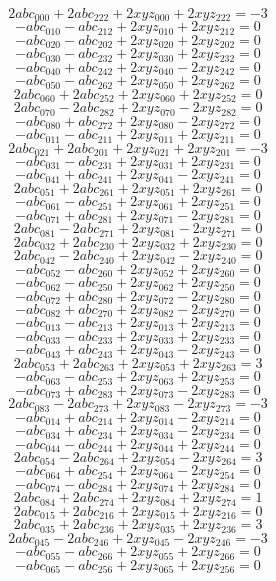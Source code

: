 \[ 2 abc_{000} + 2 abc_{222} + 2 xyz_{000} + 2 xyz_{222} = -3 \]
\[ - abc_{010} - abc_{212} + 2 xyz_{010} + 2 xyz_{212} = 0 \]
\[ - abc_{020} - abc_{202} + 2 xyz_{020} + 2 xyz_{202} = 0 \]
\[ - abc_{030} - abc_{232} + 2 xyz_{030} + 2 xyz_{232} = 0 \]
\[ - abc_{040} + abc_{242} + 2 xyz_{040} - 2 xyz_{242} = 0 \]
\[ - abc_{050} - abc_{262} + 2 xyz_{050} + 2 xyz_{262} = 0 \]
\[ 2 abc_{060} + 2 abc_{252} + 2 xyz_{060} + 2 xyz_{252} = 0 \]
\[ 2 abc_{070} - 2 abc_{282} + 2 xyz_{070} - 2 xyz_{282} = 0 \]
\[ - abc_{080} + abc_{272} + 2 xyz_{080} - 2 xyz_{272} = 0 \]
\[ - abc_{011} - abc_{211} + 2 xyz_{011} + 2 xyz_{211} = 0 \]
\[ 2 abc_{021} + 2 abc_{201} + 2 xyz_{021} + 2 xyz_{201} = -3 \]
\[ - abc_{031} - abc_{231} + 2 xyz_{031} + 2 xyz_{231} = 0 \]
\[ - abc_{041} + abc_{241} + 2 xyz_{041} - 2 xyz_{241} = 0 \]
\[ 2 abc_{051} + 2 abc_{261} + 2 xyz_{051} + 2 xyz_{261} = 0 \]
\[ - abc_{061} - abc_{251} + 2 xyz_{061} + 2 xyz_{251} = 0 \]
\[ - abc_{071} + abc_{281} + 2 xyz_{071} - 2 xyz_{281} = 0 \]
\[ 2 abc_{081} - 2 abc_{271} + 2 xyz_{081} - 2 xyz_{271} = 0 \]
\[ 2 abc_{032} + 2 abc_{230} + 2 xyz_{032} + 2 xyz_{230} = 0 \]
\[ 2 abc_{042} - 2 abc_{240} + 2 xyz_{042} - 2 xyz_{240} = 0 \]
\[ - abc_{052} - abc_{260} + 2 xyz_{052} + 2 xyz_{260} = 0 \]
\[ - abc_{062} - abc_{250} + 2 xyz_{062} + 2 xyz_{250} = 0 \]
\[ - abc_{072} + abc_{280} + 2 xyz_{072} - 2 xyz_{280} = 0 \]
\[ - abc_{082} + abc_{270} + 2 xyz_{082} - 2 xyz_{270} = 0 \]
\[ - abc_{013} - abc_{213} + 2 xyz_{013} + 2 xyz_{213} = 0 \]
\[ - abc_{033} - abc_{233} + 2 xyz_{033} + 2 xyz_{233} = 0 \]
\[ - abc_{043} + abc_{243} + 2 xyz_{043} - 2 xyz_{243} = 0 \]
\[ 2 abc_{053} + 2 abc_{263} + 2 xyz_{053} + 2 xyz_{263} = 3 \]
\[ - abc_{063} - abc_{253} + 2 xyz_{063} + 2 xyz_{253} = 0 \]
\[ - abc_{073} + abc_{283} + 2 xyz_{073} - 2 xyz_{283} = 0 \]
\[ 2 abc_{083} - 2 abc_{273} + 2 xyz_{083} - 2 xyz_{273} = -3 \]
\[ - abc_{014} + abc_{214} + 2 xyz_{014} - 2 xyz_{214} = 0 \]
\[ - abc_{034} + abc_{234} + 2 xyz_{034} - 2 xyz_{234} = 0 \]
\[ - abc_{044} - abc_{244} + 2 xyz_{044} + 2 xyz_{244} = 0 \]
\[ 2 abc_{054} - 2 abc_{264} + 2 xyz_{054} - 2 xyz_{264} = 3 \]
\[ - abc_{064} + abc_{254} + 2 xyz_{064} - 2 xyz_{254} = 0 \]
\[ - abc_{074} - abc_{284} + 2 xyz_{074} + 2 xyz_{284} = 0 \]
\[ 2 abc_{084} + 2 abc_{274} + 2 xyz_{084} + 2 xyz_{274} = 1 \]
\[ 2 abc_{015} + 2 abc_{216} + 2 xyz_{015} + 2 xyz_{216} = 0 \]
\[ 2 abc_{035} + 2 abc_{236} + 2 xyz_{035} + 2 xyz_{236} = 3 \]
\[ 2 abc_{045} - 2 abc_{246} + 2 xyz_{045} - 2 xyz_{246} = -3 \]
\[ - abc_{055} - abc_{266} + 2 xyz_{055} + 2 xyz_{266} = 0 \]
\[ - abc_{065} - abc_{256} + 2 xyz_{065} + 2 xyz_{256} = 0 \]

